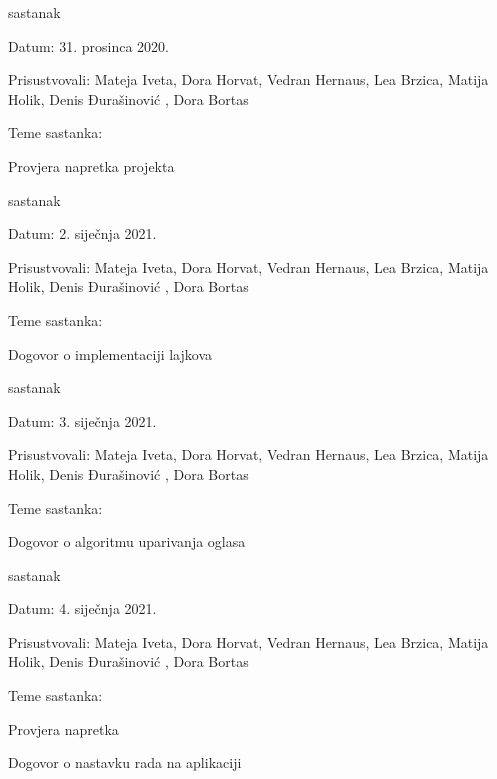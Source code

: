 \begin{packed_enum}
			\item sastanak
			\item[] \begin{packed_item}
				\item Datum: 31. prosinca 2020.
				\item Prisustvovali: Mateja Iveta, Dora Horvat, Vedran Hernaus, Lea Brzica, Matija Holik, Denis Đurašinović , Dora Bortas
				\item Teme sastanka:
				\begin{packed_item}
					\item Provjera napretka projekta
				\end{packed_item}
			\end{packed_item}
		
			\item sastanak
			\item[] \begin{packed_item}
				\item Datum: 2. siječnja 2021.
				\item Prisustvovali: Mateja Iveta, Dora Horvat, Vedran Hernaus, Lea Brzica, Matija Holik, Denis Đurašinović , Dora Bortas
				\item Teme sastanka:
				\begin{packed_item}
					\item Dogovor o implementaciji lajkova
				\end{packed_item}
			\end{packed_item}
		
			\item sastanak
			\item[] \begin{packed_item}
				\item Datum: 3. siječnja 2021.
				\item Prisustvovali: Mateja Iveta, Dora Horvat, Vedran Hernaus, Lea Brzica, Matija Holik, Denis Đurašinović , Dora Bortas
				\item Teme sastanka:
				\begin{packed_item}
					\item Dogovor o algoritmu uparivanja oglasa
				\end{packed_item}
			\end{packed_item}
		
			\item sastanak
			\item[] \begin{packed_item}
				\item Datum: 4. siječnja 2021.
				\item Prisustvovali: Mateja Iveta, Dora Horvat, Vedran Hernaus, Lea Brzica, Matija Holik, Denis Đurašinović , Dora Bortas
				\item Teme sastanka:
				\begin{packed_item}
					\item Provjera napretka
					\item Dogovor o nastavku rada na aplikaciji
				\end{packed_item}
			\end{packed_item}
		

\end{packed_enum}
